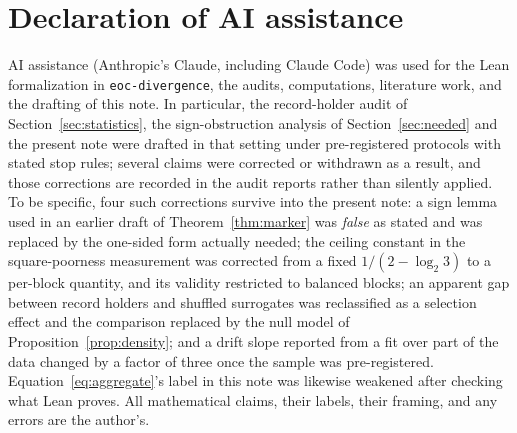 \documentclass[11pt,reqno]{amsart}
\theoremstyle{plain}
\theoremstyle{definition}
\begin{document}
\section*{Declaration of AI assistance}

AI assistance (Anthropic's Claude, including Claude Code) was used for the Lean
formalization in \texttt{eoc-divergence}, the audits, computations, literature
work, and the drafting of this note. In particular, the record-holder audit of
Section~\ref{sec:statistics}, the sign-obstruction analysis of
Section~\ref{sec:needed} and the present note were drafted in that setting under
pre-registered protocols with stated stop rules; several claims were corrected or
withdrawn as a result, and those corrections are recorded in the audit reports
rather than silently applied. To be specific, four such corrections survive into
the present note: a sign lemma used in an earlier draft of
Theorem~\ref{thm:marker} was \emph{false} as stated and was replaced by the
one-sided form actually needed; the ceiling constant in the square-poorness
measurement was corrected from a fixed $1/(2-\log_2 3)$ to a per-block quantity,
and its validity restricted to balanced blocks; an apparent gap between record
holders and shuffled surrogates was reclassified as a selection effect and the
comparison replaced by the null model of Proposition~\ref{prop:density}; and a
drift slope reported from a fit over part of the data changed by a factor of three
once the sample was pre-registered. Equation~\eqref{eq:aggregate}'s label in this
note was likewise weakened after checking what Lean proves. All mathematical
claims, their labels, their framing, and any errors are the author's.



\end{document}
